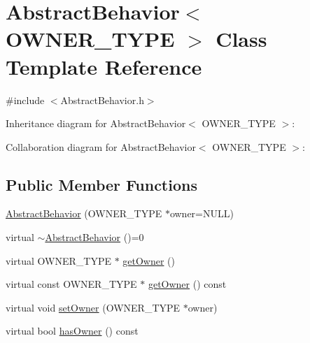 \hypertarget{class_abstract_behavior}{\section{Abstract\+Behavior$<$ O\+W\+N\+E\+R\+\_\+\+T\+Y\+P\+E $>$ Class Template Reference}
\label{class_abstract_behavior}
}


{\ttfamily \#include $<$Abstract\+Behavior.\+h$>$}



Inheritance diagram for Abstract\+Behavior$<$ O\+W\+N\+E\+R\+\_\+\+T\+Y\+P\+E $>$\+:


Collaboration diagram for Abstract\+Behavior$<$ O\+W\+N\+E\+R\+\_\+\+T\+Y\+P\+E $>$\+:
\subsection*{Public Member Functions}
\begin{DoxyCompactItemize}
\item 
\hyperlink{class_abstract_behavior_a1c29fddda6c5193557e84d23e8c69bd6}{Abstract\+Behavior} (O\+W\+N\+E\+R\+\_\+\+T\+Y\+P\+E $\ast$owner=N\+U\+L\+L)
\item 
virtual \hyperlink{class_abstract_behavior_a755dede21d941b4620fed536bda70742}{$\sim$\+Abstract\+Behavior} ()=0
\item 
virtual O\+W\+N\+E\+R\+\_\+\+T\+Y\+P\+E $\ast$ \hyperlink{class_abstract_behavior_a3ef173c0a28a99ae80db319103e9dada}{get\+Owner} ()
\item 
virtual const O\+W\+N\+E\+R\+\_\+\+T\+Y\+P\+E $\ast$ \hyperlink{class_abstract_behavior_a36a2e9c8ad931e1e79023ce818a0d892}{get\+Owner} () const 
\item 
virtual void \hyperlink{class_abstract_behavior_af14d8906acd11e875097471fba183cf4}{set\+Owner} (O\+W\+N\+E\+R\+\_\+\+T\+Y\+P\+E $\ast$owner)
\item 
virtual bool \hyperlink{class_abstract_behavior_a43de94d998148546b2ff9707c104194e}{has\+Owner} () const 
\end{DoxyCompactItemize}


